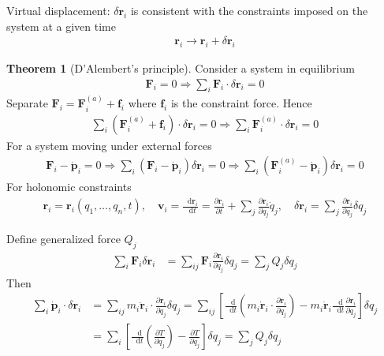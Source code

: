 \documentclass[twoside,11pt]{article}
\numberwithin{equation}{section} %
\newcommand{\lms}{\fontfamily{lmss}\selectfont} %
\renewcommand*\d{\mathop{}\!\mathrm{d}}
\theoremstyle{definition}
\newtheorem{theorem}{\lms Theorem}[section]
\theoremstyle{remark}
\begin{document}
Virtual displacement: $\delta\mathbf{r}_i$
is consistent with the constraints imposed on the system at
a given time
\begin{align}
    \mathbf{r}_i \rightarrow 
    \mathbf{r}_i + \delta\mathbf{r}_i
\end{align}
\begin{theorem}[D'Alembert's principle]
Consider a system in equilibrium
\begin{align}
    \mathbf{F}_i = 0
    \Rightarrow
    \sum_i\mathbf{F}_i\cdot\delta\mathbf{r}_i = 0
\end{align}
Separate $\mathbf{F}_i = \mathbf{F}_i^{(a)} + \mathbf{f}_i$
where $\mathbf{f}_i$ is the constraint force.
Hence
\begin{align}
    \sum_i(\mathbf{F}_i^{(a)} + \mathbf{f}_i)
    \cdot\delta\mathbf{r}_i = 0
    \Rightarrow
    \sum_i\mathbf{F}_i^{(a)}\cdot\delta\mathbf{r}_i = 0
\end{align}
For a system moving under external forces
\begin{align}
    \mathbf{F}_i - \dot{\mathbf{p}}_i = 0
    \Rightarrow
    \sum_i(\mathbf{F}_i - \dot{\mathbf{p}}_i)\delta\mathbf{r}_i = 0
    \Rightarrow
    \sum_i(\mathbf{F}_i^{(a)} - \dot{\mathbf{p}}_i)\delta\mathbf{r}_i = 0
\end{align}
For holonomic constraints
\begin{align}
    \mathbf{r}_i = \mathbf{r}_i(q_1,\dots,q_n,t),\quad
    \mathbf{v}_i = \frac{\d\mathbf{r}_i}{\d t}
    = \frac{\partial \mathbf{r}_i}{\partial t}
    + \sum_j\frac{\partial\mathbf{r}_i}{\partial q_j}\dot{q}_j,\quad
    \delta\mathbf{r}_i = \sum_j\frac{\partial\mathbf{r}_i}{\partial q_j}
    \delta q_j
\end{align}
\end{theorem}
Define generalized force $Q_j$
\begin{align}
    \sum_i\mathbf{F}_i\delta\mathbf{r}_i
    &= \sum_{ij}\mathbf{F}_i\frac{\partial\mathbf{r}_i}{\partial q_j}\delta q_j
    = \sum_j Q_j\delta q_j
\end{align}
Then
\begin{align}
    \sum_i\dot{\mathbf{p}}_i\cdot\delta\mathbf{r}_i
    &= \sum_{ij}m_i\ddot{\mathbf{r}}_i
    \cdot\frac{\partial \mathbf{r}_i}{\partial q_j}\delta q_j
    = 
    \sum_{ij}\left[
        \frac{\d}{\d t}
        \left(m_i\dot{\mathbf{r}}_i\cdot\frac{\partial\mathbf{r}_i}{\partial q_j}\right)
        - m_i\dot{\mathbf{r}}_i\frac{\d}{\d t}\frac{\partial\mathbf{r}_i}{\partial q_j}
    \right]\delta q_j\\
    &= 
    \sum_i\left[
        \frac{\d }{\d t}\left(\frac{\partial T}{\partial\dot{q}_j}\right)
        - \frac{\partial T}{\partial q_j}
    \right]\delta q_j
    = \sum_j Q_j\delta q_j\\
\end{align}
\end{document}
